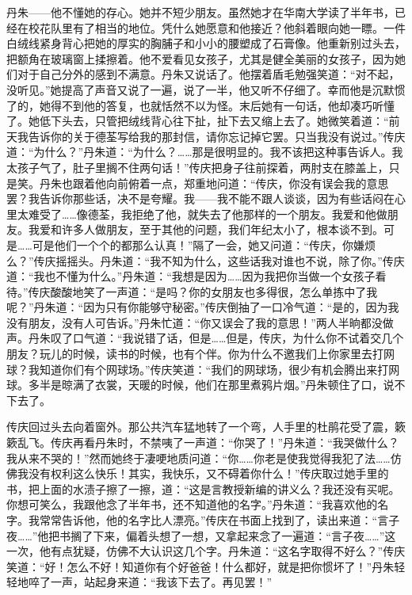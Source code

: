 \documentclass[UTF8]{ctexart}
\begin{document}
丹朱——他不懂她的存心。她并不短少朋友。虽然她才在华南大学读了半年书，已经在校花队里有了相当的地位。凭什么她愿意和他接近？他斜着眼向她一瞟。一件白绒线紧身背心把她的厚实的胸脯子和小小的腰塑成了石膏像。他重新别过头去，把额角在玻璃窗上揉擦着。他不爱看见女孩子，尤其是健全美丽的女孩子，因为她们对于自己分外的感到不满意。丹朱又说话了。他摆着盾毛勉强笑道：“对不起，没听见。”她提高了声音又说了一遍，说了一半，他又听不仔细了。幸而他是沉默惯了的，她得不到他的答复，也就恬然不以为怪。末后她有一句话，他却凑巧听懂了。她低下头去，只管把绒线背心往下扯，扯下去又缩上去了。她微笑着道：“前天我告诉你的关于德荃写给我的那封信，请你忘记掉它罢。只当我没有说过。”传庆道：“为什么？”丹朱道：“为什么？……那是很明显的。我不该把这种事告诉人。我太孩子气了，肚子里搁不住两句话！”传庆把身子往前探着，两肘支在膝盖上，只是笑。丹朱也跟着他向前俯着一点，郑重地问道：“传庆，你没有误会我的意思罢？我告诉你那些话，决不是夸耀。我——我不能不跟人谈谈，因为有些话闷在心里太难受了……像德荃，我拒绝了他，就失去了他那样的一个朋友。我爱和他做朋友。我爱和许多人做朋友，至于其他的问题，我们年纪太小了，根本谈不到。可是……可是他们一个个的都那么认真！”隔了一会，她又问道：“传庆，你嫌烦么？”传庆摇摇头。丹朱道：“我不知为什么，这些话我对谁也不说，除了你。”传庆道：“我也不懂为什么。”丹朱道：“我想是因为……因为我把你当做一个女孩子看待。”传庆酸酸地笑了一声道：“是吗？你的女朋友也多得很，怎么单拣中了我呢？”丹朱道：“因为只有你能够守秘密。”传庆倒抽了一口冷气道：“是的，因为我没有朋友，没有人可告诉。”丹朱忙道：“你又误会了我的意思！”两人半晌都没做声。丹朱叹了口气道：“我说错了话，但是……但是，传庆，为什么你不试着交几个朋友？玩儿的时候，读书的时候，也有个伴。你为什么不邀我们上你家里去打网球？我知道你们有个网球场。”传庆笑道：“我们的网球场，很少有机会腾出来打网球。多半是晾满了衣裳，天暖的时候，他们在那里煮鸦片烟。”丹朱顿住了口，说不下去了。

传庆回过头去向着窗外。那公共汽车猛地转了一个弯，人手里的杜鹃花受了震，簌簌乱飞。传庆再看丹朱时，不禁咦了一声道：“你哭了！”丹朱道：“我哭做什么？我从来不哭的！”然而她终于凄哽地质问道：“你……你老是使我觉得我犯了法……仿佛我没有权利这么快乐！其实，我快乐，又不碍着你什么！”传庆取过她手里的书，把上面的水渍子擦了一擦，道：“这是言教授新编的讲义么？我还没有买呢。你想可笑么，我跟他念了半年书，还不知道他的名字。”丹朱道：“我喜欢他的名字。我常常告诉他，他的名字比人漂亮。”传庆在书面上找到了，读出来道：“言子夜……”他把书搁了下来，偏着头想了一想，又拿起来念了一遍道：“言子夜……”这一次，他有点犹疑，仿佛不大认识这几个字。丹朱道：“这名字取得不好么？”传庆笑道：“好！怎么不好！知道你有个好爸爸！什么都好，就是把你惯坏了！”丹朱轻轻地啐了一声，站起身来道：“我该下去了。再见罢！”
\end{document}
